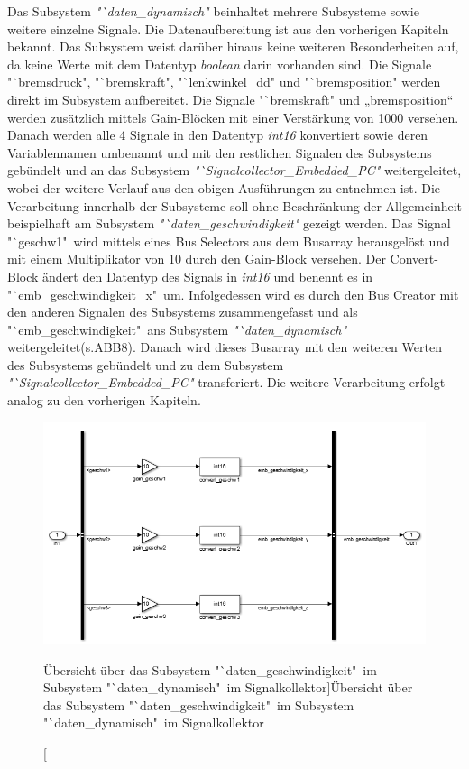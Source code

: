 \documentclass[fontsize = 12pt, paper = a4]{scrreprt}
\begin{document}
Das Subsystem \textit{"`daten\_dynamisch"} beinhaltet mehrere Subsysteme sowie weitere einzelne Signale. Die Datenaufbereitung ist aus den vorherigen Kapiteln bekannt. Das Subsystem weist darüber hinaus keine weiteren Besonderheiten auf, da keine Werte mit dem Datentyp \textit{boolean} darin vorhanden sind. Die Signale "`bremsdruck", "`bremskraft", "`lenkwinkel\_dd" und "`bremsposition" werden direkt im Subsystem aufbereitet. Die Signale "`bremskraft" und „bremsposition“ werden zusätzlich mittels Gain-Blöcken mit einer Verstärkung von 1000 versehen. Danach werden alle 4 Signale in den Datentyp \textit{int16} konvertiert sowie deren Variablennamen  umbenannt und mit den restlichen Signalen des Subsystems gebündelt und an das Subsystem \textit{"`Signalcollector\_Embedded\_PC"} weitergeleitet, wobei der weitere Verlauf aus den obigen Ausführungen zu entnehmen ist. Die Verarbeitung innerhalb der Subsysteme soll ohne Beschränkung der Allgemeinheit beispielhaft am Subsystem \textit{"`daten\_geschwindigkeit"} gezeigt werden. Das Signal "`geschw1"\ wird mittels eines Bus Selectors aus dem Busarray herausgelöst und mit einem Multiplikator von 10  durch den Gain-Block versehen. Der Convert-Block ändert den Datentyp des Signals in \textit{int16} und benennt es in "`emb\_geschwindigkeit\_x"\ um. Infolgedessen wird es durch den Bus Creator mit den anderen Signalen des Subsystems zusammengefasst und als "`emb\_geschwindigkeit"\ ans Subsystem \textit{"`daten\_dynamisch"} weitergeleitet(s.ABB8). Danach wird dieses Busarray mit den weiteren Werten des Subsystems gebündelt und zu dem Subsystem \textit{"`Signalcollector\_Embedded\_PC"} transferiert. Die weitere Verarbeitung erfolgt analog zu den vorherigen Kapiteln.

\begin{figure}[h]
\centering
\includegraphics[scale = 0.77]{sc_daten_geschwindigkeit}
\caption[Übersicht über das Subsystem "`daten\_geschwindigkeit"\ im Subsystem "`daten\_dynamisch"\ im Signalkollektor]{Übersicht über das Subsystem "`daten\_geschwindigkeit"\ im Subsystem "`daten\_dynamisch"\ im Signalkollektor}
\label{scdatengeschwindigkeit}
\end{figure}
\end{document}
